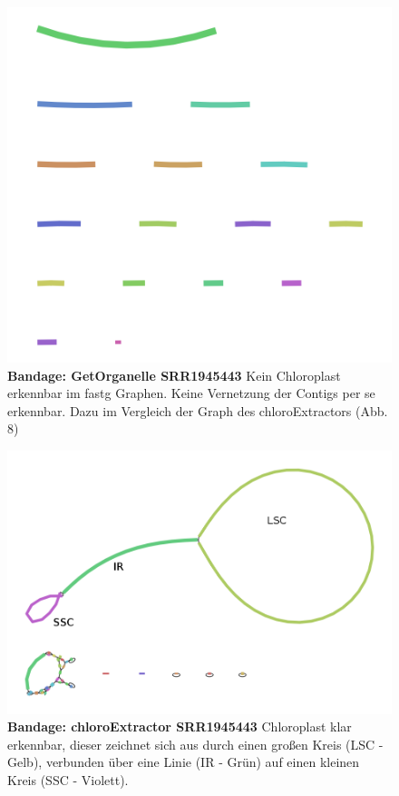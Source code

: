\documentclass{scrartcl}
\begin{document}
\begin{figure}
\includegraphics[width=.9\linewidth]{./graph_GO_SRR1945443.png}
\caption[Bandage: GetOrganelle SRR1945443]{\textbf{Bandage: GetOrganelle SRR1945443} Kein Chloroplast erkennbar im fastg Graphen. Keine Vernetzung der Contigs per se erkennbar. Dazu im Vergleich der Graph des chloroExtractors (Abb. 8)}
\end{figure}
\begin{figure}
\includegraphics[width=.9\linewidth]{./graph_CE_SRR1945443_1.png}
\caption[Bandage: chloroExtractor SRR1945443]{\textbf{Bandage: chloroExtractor SRR1945443} Chloroplast klar erkennbar, dieser zeichnet sich aus durch einen großen Kreis (LSC - Gelb), verbunden über eine Linie (IR - Grün) auf einen kleinen Kreis (SSC - Violett). }
\end{figure}
\end{document}
